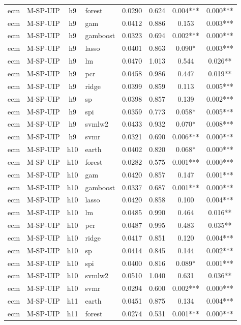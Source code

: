 \begin{ThreePartTable}
\begin{longtable}[t]{llclcccc}
ecm & M-SP-UIP & h9 & forest & 0.0290 & 0.624 & 0.004*** & 0.000***\\
ecm & M-SP-UIP & h9 & gam & 0.0412 & 0.886 & 0.153 & 0.003***\\
ecm & M-SP-UIP & h9 & gamboost & 0.0323 & 0.694 & 0.002*** & 0.000***\\
ecm & M-SP-UIP & h9 & lasso & 0.0401 & 0.863 & 0.090* & 0.003***\\
ecm & M-SP-UIP & h9 & lm & 0.0470 & 1.013 & 0.544 & 0.026**\\
ecm & M-SP-UIP & h9 & pcr & 0.0458 & 0.986 & 0.447 & 0.019**\\
ecm & M-SP-UIP & h9 & ridge & 0.0399 & 0.859 & 0.113 & 0.005***\\
ecm & M-SP-UIP & h9 & sp & 0.0398 & 0.857 & 0.139 & 0.002***\\
ecm & M-SP-UIP & h9 & spi & 0.0359 & 0.773 & 0.058* & 0.005***\\
ecm & M-SP-UIP & h9 & svmlw2 & 0.0433 & 0.932 & 0.070* & 0.008***\\
ecm & M-SP-UIP & h9 & svmr & 0.0321 & 0.690 & 0.006*** & 0.000***\\
\addlinespace
ecm & M-SP-UIP & h10 & earth & 0.0402 & 0.820 & 0.068* & 0.000***\\
ecm & M-SP-UIP & h10 & forest & 0.0282 & 0.575 & 0.001*** & 0.000***\\
ecm & M-SP-UIP & h10 & gam & 0.0420 & 0.857 & 0.147 & 0.001***\\
ecm & M-SP-UIP & h10 & gamboost & 0.0337 & 0.687 & 0.001*** & 0.000***\\
ecm & M-SP-UIP & h10 & lasso & 0.0420 & 0.858 & 0.100 & 0.004***\\
ecm & M-SP-UIP & h10 & lm & 0.0485 & 0.990 & 0.464 & 0.016**\\
ecm & M-SP-UIP & h10 & pcr & 0.0487 & 0.995 & 0.483 & 0.035**\\
ecm & M-SP-UIP & h10 & ridge & 0.0417 & 0.851 & 0.120 & 0.004***\\
ecm & M-SP-UIP & h10 & sp & 0.0414 & 0.845 & 0.144 & 0.002***\\
ecm & M-SP-UIP & h10 & spi & 0.0400 & 0.816 & 0.089* & 0.001***\\
ecm & M-SP-UIP & h10 & svmlw2 & 0.0510 & 1.040 & 0.631 & 0.036**\\
ecm & M-SP-UIP & h10 & svmr & 0.0294 & 0.600 & 0.002*** & 0.000***\\
\addlinespace
ecm & M-SP-UIP & h11 & earth & 0.0451 & 0.875 & 0.134 & 0.004***\\
ecm & M-SP-UIP & h11 & forest & 0.0274 & 0.531 & 0.001*** & 0.000***\\

\end{longtable}
\end{ThreePartTable}
